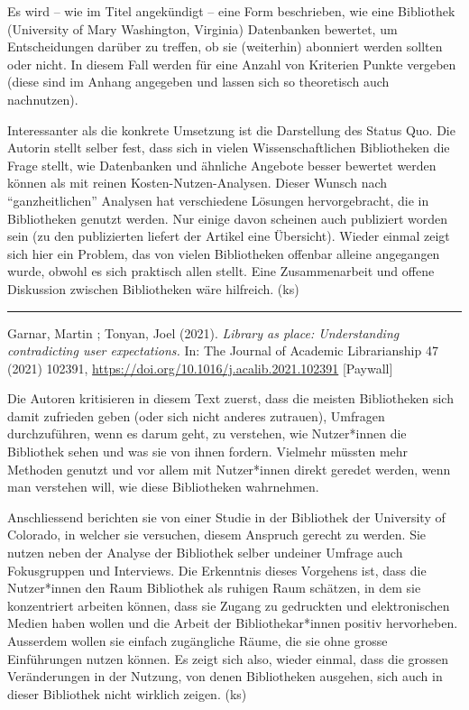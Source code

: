\documentclass[a4paper,
fontsize=11pt,
oneside,
numbers=noperiodatend,
parskip=half-,
bibliography=totoc,
final
]{scrartcl}
\begin{document}
Es wird -- wie im Titel angekündigt -- eine Form beschrieben, wie eine
Bibliothek (University of Mary Washington, Virginia) Datenbanken
bewertet, um Entscheidungen darüber zu treffen, ob sie (weiterhin)
abonniert werden sollten oder nicht. In diesem Fall werden für eine
Anzahl von Kriterien Punkte vergeben (diese sind im Anhang angegeben und
lassen sich so theoretisch auch nachnutzen).

Interessanter als die konkrete Umsetzung ist die Darstellung des Status
Quo. Die Autorin stellt selber fest, dass sich in vielen
Wissenschaftlichen Bibliotheken die Frage stellt, wie Datenbanken und
ähnliche Angebote besser bewertet werden können als mit reinen
Kosten-Nutzen-Analysen. Dieser Wunsch nach \enquote{ganzheitlichen}
Analysen hat verschiedene Lösungen hervorgebracht, die in Bibliotheken
genutzt werden. Nur einige davon scheinen auch publiziert worden sein
(zu den publizierten liefert der Artikel eine Übersicht). Wieder einmal
zeigt sich hier ein Problem, das von vielen Bibliotheken offenbar
alleine angegangen wurde, obwohl es sich praktisch allen stellt. Eine
Zusammenarbeit und offene Diskussion zwischen Bibliotheken wäre
hilfreich. (ks)

\begin{center}\rule{0.5\linewidth}{0.5pt}\end{center}

Garnar, Martin ; Tonyan, Joel (2021). \emph{Library as place:
Understanding contradicting user expectations.} In: The Journal of
Academic Librarianship 47 (2021) 102391,
\url{https://doi.org/10.1016/j.acalib.2021.102391} {[}Paywall{]}

Die Autoren kritisieren in diesem Text zuerst, dass die meisten
Bibliotheken sich damit zufrieden geben (oder sich nicht anderes
zutrauen), Umfragen durchzuführen, wenn es darum geht, zu verstehen, wie
Nutzer*innen die Bibliothek sehen und was sie von ihnen fordern.
Vielmehr müssten mehr Methoden genutzt und vor allem mit Nutzer*innen
direkt geredet werden, wenn man verstehen will, wie diese Bibliotheken
wahrnehmen.

Anschliessend berichten sie von einer Studie in der Bibliothek der
University of Colorado, in welcher sie versuchen, diesem Anspruch
gerecht zu werden. Sie nutzen neben der Analyse der Bibliothek selber
undeiner Umfrage auch Fokusgruppen und Interviews. Die Erkenntnis dieses
Vorgehens ist, dass die Nutzer*innen den Raum Bibliothek als ruhigen
Raum schätzen, in dem sie konzentriert arbeiten können, dass sie Zugang
zu gedruckten und elektronischen Medien haben wollen und die Arbeit der
Bibliothekar*innen positiv hervorheben. Ausserdem wollen sie einfach
zugängliche Räume, die sie ohne grosse Einführungen nutzen können. Es
zeigt sich also, wieder einmal, dass die grossen Veränderungen in der
Nutzung, von denen Bibliotheken ausgehen, sich auch in dieser Bibliothek
nicht wirklich zeigen. (ks)
\end{document}
